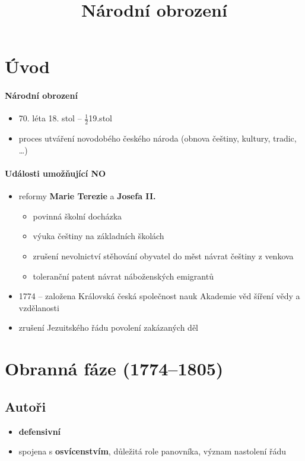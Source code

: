 \title{Národní obrození}


\section*{Úvod}
\paragraph{Národní obrození}
\begin{itemize}
\item 70. léta 18. stol -- $\frac{1}{2}$19.stol
\item proces utváření novodobého českého národa (obnova češtiny, kultury, tradic, \ldots)
\end{itemize}
\paragraph{Události umožňující NO}
\begin{itemize}
\item reformy \textbf{Marie Terezie} a \textbf{Josefa II.}
	\begin{itemize}
	\item povinná školní docházka
	\item výuka češtiny na základních školách
	\item zrušení nevolnictví \ra stěhování obyvatel do měst \ra návrat češtiny z venkova
	\item toleranční patent \ra návrat náboženských emigrantů
	\end{itemize}
\item 1774 -- založena Královská česká společnost nauk \ra Akademie věd \ra šíření vědy a vzdělanosti
\item zrušení Jezuitského řádu \ra povolení zakázaných děl
\end{itemize}

\section{Obranná fáze (1774--1805)}
\subsection{Autoři}
\begin{itemize}
\item \textbf{defensivní}
\item spojena s \textbf{osvícenstvím}, důležitá role panovníka, význam nastolení řádu
\end{itemize}

